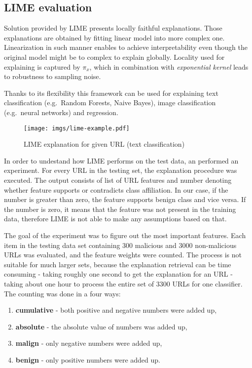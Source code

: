 \subsection{LIME evaluation}\label{subsec:lime-evaluation}

Solution provided by LIME presents locally faithful explanations.
Those explanations are obtained by fitting linear model into more complex one.
Linearization in such manner enables to achieve interpretability even though the original model might be to complex to explain globally.
Locality used for explaining is captured by \( \pi_x \), which in combination with \textit{exponential kernel} leads to robustness to sampling noise.

Thanks to its flexibility this framework can be used for explaining text classification (e.g.\ Random Forests, Naive Bayes), image classification (e.g.\ neural networks) and regression.

\begin{figure}[htb]
    \centering
    \texttt{[image: imgs/lime-example.pdf]}
    \caption{LIME explanation for given URL (text classification)}
    \label{fig:lime}
\end{figure}
\FloatBarrier

In order to undestand how LIME performs on the test data, an performed an experiment.
For every URL in the testing set, the explanation procedure was executed.
The output consists of list of URL features and number denoting whether feature supports or contradicts class affiliation.
In our case, if the number is greater than zero, the feature supports benign class and vice versa.
If the number is zero, it means that the feature was not present in the training data, therefore LIME is not able to make any assumptions based on that.

The goal of the experiment was to figure out the most important features.
Each item in the testing data set containing 300 malicious and 3000 non-malicious URLs was evaluated, and the feature weights were counted.
The process is not suitable for much larger sets, because the explanation retrieval can be time consuming - taking roughly one second to get the explanation for an URL - taking about one hour to process the entire set of 3300 URLs for one classifier.
The counting was done in a four ways:

\begin{enumerate}
    \item \textbf{cumulative} - both positive and negative numbers were added up,
    \item \textbf{absolute} - the absolute value of numbers was added up,
    \item \textbf{malign} - only negative numbers were added up,
    \item \textbf{benign} - only positive numbers were added up.
\end{enumerate}

